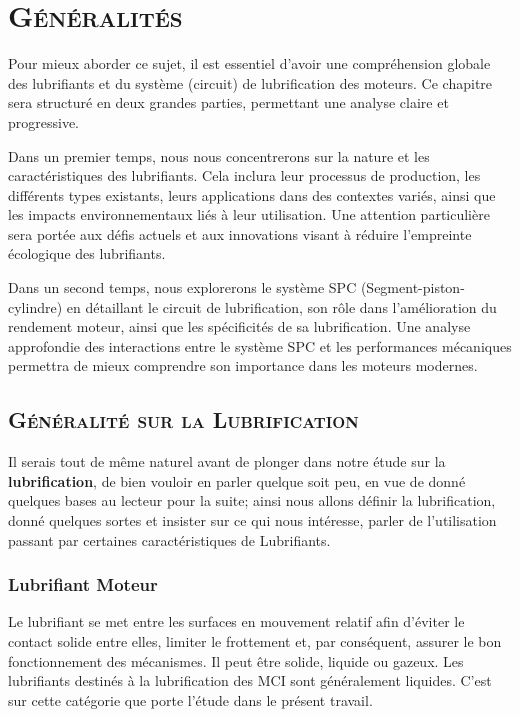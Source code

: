 \chapter{\textsc{Généralités}}\label{generalite}
Pour mieux aborder ce sujet, il est essentiel d'avoir une compréhension globale des lubrifiants et du système (circuit) de lubrification des moteurs. Ce chapitre sera structuré en deux grandes parties, permettant une analyse claire et progressive.

Dans un premier temps, nous nous concentrerons sur la nature et les caractéristiques des lubrifiants. Cela inclura leur processus de production, les différents types existants, leurs applications dans des contextes variés, ainsi que les impacts environnementaux liés à leur utilisation. Une attention particulière sera portée aux défis actuels et aux innovations visant à réduire l'empreinte écologique des lubrifiants.

Dans un second temps, nous explorerons le système SPC (Segment-piston-cylindre) en détaillant le circuit de lubrification, son rôle dans l'amélioration du rendement moteur, ainsi que les spécificités de sa lubrification. Une analyse approfondie des interactions entre le système SPC et les performances mécaniques permettra de mieux comprendre son importance dans les moteurs modernes.

\section{\textsc{Généralité sur la Lubrification}}\label{lubrification}
Il serais tout de même naturel avant de plonger dans notre étude sur la \textbf{lubrification}, de bien vouloir en parler quelque soit peu, en vue de donné quelques bases au lecteur pour la suite; ainsi nous allons définir la lubrification, donné quelques sortes et insister sur ce qui nous intéresse, parler de l'utilisation  passant par certaines caractéristiques de Lubrifiants.

\subsection{Lubrifiant Moteur}
Le lubrifiant se met entre les surfaces en mouvement relatif afin d'éviter le contact solide entre elles, limiter le frottement et, par conséquent, assurer le bon fonctionnement des mécanismes. Il peut être solide, liquide ou gazeux. Les lubrifiants destinés à la lubrification des MCI sont généralement liquides. C'est sur cette catégorie que porte l'étude dans le présent travail.\\

